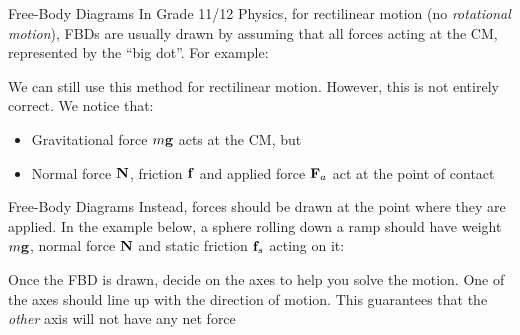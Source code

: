 \documentclass[12pt,compress,aspectratio=169]{beamer}
\newcommand{\mb}[1]{\ensuremath\mathbf{#1}}
\begin{document}
\begin{frame}{Free-Body Diagrams}
  In Grade 11/12 Physics, for rectilinear motion (no \emph{rotational motion}),
  FBDs are usually drawn by assuming that all forces acting at the CM,
  represented by the ``big dot''. For example:
  \begin{center}
    \vspace{-.15in}
  \end{center}
  \vspace{-.1in}We can still use this method for rectilinear motion. However,
  this is not entirely correct. We notice that:
  \begin{itemize}
  \item Gravitational force $m\mb{g}$ acts at the CM, but
  \item Normal force $\mb{N}$, friction $\mb{f}$ and applied force $\mb{F}_a$
    act at the point of contact
  \end{itemize}
\end{frame}



\begin{frame}{Free-Body Diagrams}
  Instead, forces should be drawn at the point where they are applied. In the
  example below, a sphere rolling down a ramp should have weight $m\mb{g}$,
  normal force $\mb{N}$ and static friction $\mb{f}_s$ acting on it:
  \begin{center}
  \end{center}
  Once the FBD is drawn, decide on the axes to help you solve the motion. One of
  the axes should line up with the direction of motion. This guarantees that the 
  \emph{other} axis will not have any net force
\end{frame}
\end{document}
